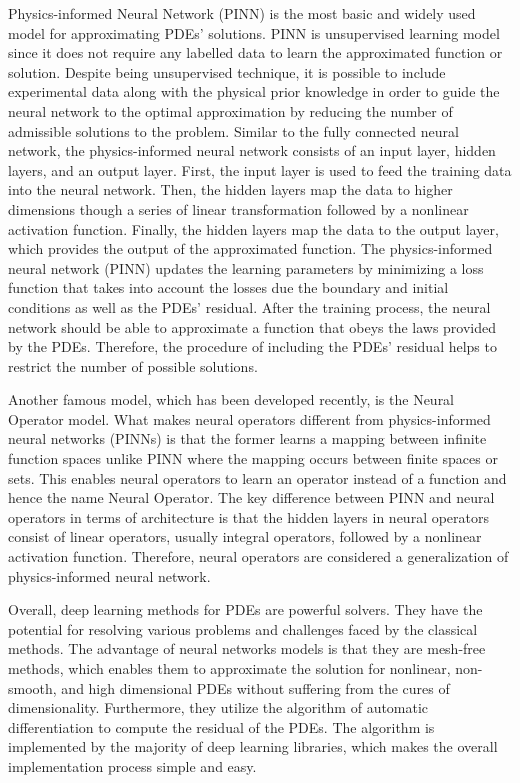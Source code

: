 \documentclass[a4paper,12pt]{article}
\theoremstyle{definition}
\begin{document}
Physics-informed Neural Network (PINN) is the most basic and widely used model for approximating PDEs' solutions. 
PINN is unsupervised learning model since it does not require any 
labelled data to learn the approximated function or solution\cite{cuomo2022scientific}.
Despite being unsupervised technique, it is possible to include experimental data along with the physical prior knowledge
in order to guide the neural network to the optimal approximation by reducing the 
number of admissible solutions to the problem\cite{hao2022physics,raissi2019physics}.
Similar to the fully connected neural network, the physics-informed neural network consists of 
an input layer, hidden layers, and an output layer. First, the input layer is used to feed 
the training data into the neural network.  Then, the hidden layers map the data to higher dimensions though 
a series of linear transformation followed by a nonlinear activation function. 
Finally, the hidden layers map the data to the output layer, which provides the output of the approximated function. 
The physics-informed neural network (PINN) updates the learning parameters by minimizing a loss function that takes 
into account the losses due the boundary and initial conditions as well as the PDEs' residual. 
After the training process, the neural network should be able to approximate a function that obeys the laws provided by the PDEs. 
Therefore, the procedure of including the PDEs' residual helps to restrict the number of possible solutions\cite{cuomo2022scientific}. 

Another famous model, which has been developed recently, is the Neural Operator model. 
What makes neural operators different from physics-informed neural networks (PINNs) is that the former 
learns a mapping between infinite function spaces unlike PINN where the mapping occurs between finite spaces or sets. 
This enables neural operators to learn an operator instead of a function and hence the name Neural Operator.
The key difference between PINN and neural operators in terms of architecture is that the 
hidden layers in neural operators consist of linear operators, usually integral operators, 
followed by a nonlinear activation function. 
Therefore, neural operators are considered a generalization of physics-informed neural network\cite{kovachki2021neural}.

Overall, deep learning methods for PDEs are powerful solvers. 
They have the potential for resolving various problems and challenges faced by the classical methods. 
The advantage of neural networks models is that they are mesh-free methods, which enables them to approximate 
the solution for nonlinear, non-smooth, and high dimensional PDEs without suffering from the cures of dimensionality.
Furthermore, they utilize the algorithm of automatic differentiation to compute the residual of the PDEs. 
The algorithm is implemented by the majority of deep learning libraries, 
which makes the overall implementation process simple and easy. 
\end{document}
